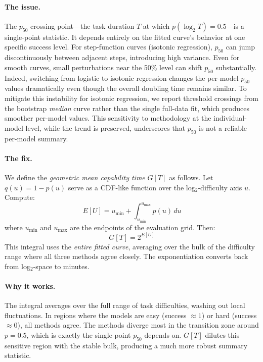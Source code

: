\documentclass[11pt,a4paper]{article}
\begin{document}
\paragraph{The issue.}
The $p_{50}$ crossing point---the task duration $T$ at which $p(\log_2 T) = 0.5$---is a single-point statistic.
It depends entirely on the fitted curve's behavior at one specific success level.
For step-function curves (isotonic regression), $p_{50}$ can jump discontinuously between adjacent steps, introducing high variance.
Even for smooth curves, small perturbations near the 50\% level can shift $p_{50}$ substantially.
Indeed, switching from logistic to isotonic regression changes the per-model $p_{50}$ values dramatically even though the overall doubling time remains similar.
To mitigate this instability for isotonic regression, we report threshold crossings from the bootstrap \emph{median} curve rather than the single full-data fit, which produces smoother per-model values.
This sensitivity to methodology at the individual-model level, while the trend is preserved, underscores that $p_{50}$ is not a reliable per-model summary.

\paragraph{The fix.}
We define the \emph{geometric mean capability time} $G[T]$ as follows.
Let $q(u) = 1 - p(u)$ serve as a CDF-like function over the log$_2$-difficulty axis $u$.
Compute:
\[
  E[U] = u_{\min} + \int_{u_{\min}}^{u_{\max}} p(u)\, du
\]
where $u_{\min}$ and $u_{\max}$ are the endpoints of the evaluation grid.
Then:
\[
  G[T] = 2^{E[U]}
\]
This integral uses the \emph{entire fitted curve}, averaging over the bulk of the difficulty range where all three methods agree closely.
The exponentiation converts back from log$_2$-space to minutes.

\paragraph{Why it works.}
The integral averages over the full range of task difficulties, washing out local fluctuations.
In regions where the models are easy (success $\approx 1$) or hard (success $\approx 0$), all methods agree.
The methods diverge most in the transition zone around $p = 0.5$, which is exactly the single point $p_{50}$ depends on.
$G[T]$ dilutes this sensitive region with the stable bulk, producing a much more robust summary statistic.
\end{document}
